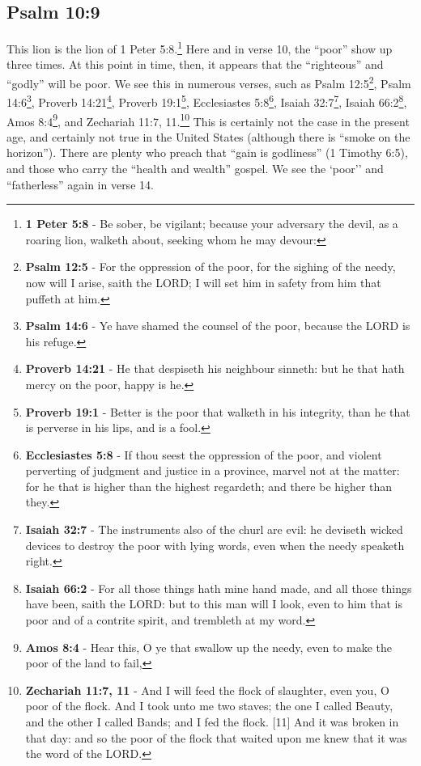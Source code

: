 \subsection{Psalm 10:9}
This lion is the lion of 1 Peter 5:8.\footnote{\textbf{1 Peter 5:8} - Be sober, be vigilant; because your adversary the devil, as a roaring lion, walketh about, seeking whom he may devour:} Here and in verse 10, the ``poor'' show up three times. At this point in time, then, it appears that the ``righteous'' and ``godly'' will be poor. We see this in numerous verses, such as Psalm 12:5\footnote{\textbf{Psalm 12:5} - For the oppression of the poor, for the sighing of the needy, now will I arise, saith the LORD; I will set him in safety from him that puffeth at him.}, Psalm 14:6\footnote{\textbf{Psalm 14:6} - Ye have shamed the counsel of the poor, because the LORD is his refuge.}, Proverb 14:21\footnote{\textbf{Proverb 14:21} - He that despiseth his neighbour sinneth: but he that hath mercy on the poor, happy is he.}, Proverb 19:1\footnote{\textbf{Proverb 19:1} - Better is the poor that walketh in his integrity, than he that is perverse in his lips, and is a fool.}, Ecclesiastes 5:8\footnote{\textbf{Ecclesiastes 5:8} - If thou seest the oppression of the poor, and violent perverting of judgment and justice in a province, marvel not at the matter: for he that is higher than the highest regardeth; and there be higher than they.}, Isaiah 32:7\footnote{\textbf{Isaiah 32:7} - The instruments also of the churl are evil: he deviseth wicked devices to destroy the poor with lying words, even when the needy speaketh right.}, Isaiah 66:2\footnote{\textbf{Isaiah 66:2} - For all those things hath mine hand made, and all those things have been, saith the LORD: but to this man will I look, even to him that is poor and of a contrite spirit, and trembleth at my word.}, Amos 8:4\footnote{\textbf{Amos 8:4} - Hear this, O ye that swallow up the needy, even to make the poor of the land to fail,}, and Zechariah 11:7, 11.\footnote{\textbf{Zechariah 11:7, 11} - And I will feed the flock of slaughter, even you, O poor of the flock. And I took unto me two staves; the one I called Beauty, and the other I called Bands; and I fed the flock. [11] And it was broken in that day: and so the poor of the flock that waited upon me knew that it was the word of the LORD.} This is certainly not the case in the present age, and certainly not true in the United States (although there is ``smoke on the horizon''). There are plenty who preach that ``gain is godliness'' (1 Timothy 6:5), and those who carry the ``health and wealth'' gospel. We see the `poor'' and ``fatherless'' again in verse 14.

